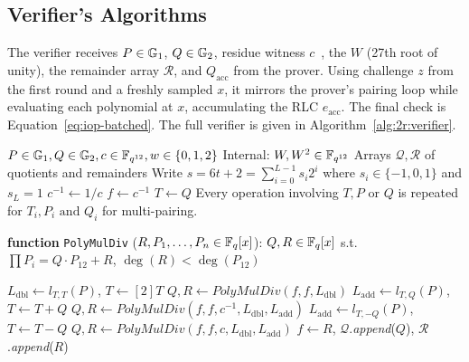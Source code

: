 \subsection{Verifier's Algorithms}

The verifier receives $P \in \mathbb{G}_1$, $Q \in \mathbb{G}_2$, residue witness $c$~\cite{EPRINT:NovEag24}, the $W$ (27th root of unity), the remainder array $\mathcal{R}$, and $Q_\text{acc}$ from the prover. Using challenge $z$ from the first round and a freshly sampled $x$, it mirrors the prover's pairing loop while evaluating each polynomial at $x$, accumulating the RLC $e_\text{acc}$. The final check is Equation~\ref{eq:iop-batched}. The full verifier is given in Algorithm~\ref{alg:2r:verifier}.


\begin{algorithm}[H]
\caption{Pairing Prover: Preparing polynomials}
\label{alg:2r:prover}
\begin{algorithmic}[1]
\Require $P \in \mathbb{G}_1, Q \in \mathbb{G}_2, c \in \mathbb{F}_{q^{12}}, w \in \{0,1,2\}$
\Statex Internal: $W, W^2 \in \mathbb{F}_{q^{12}}$ 
\Ensure Arrays $\mathcal{Q}, \mathcal{R}$ of quotients and remainders
\Statex Write $s = 6t + 2 = \sum_{i=0}^{L-1} s_i 2^i$ where $s_i \in \{-1, 0, 1\}$ and $s_L = 1$
\State $c^{-1} \leftarrow 1 / c$ 
\State $f \leftarrow c^{-1}$ 
\State $T \leftarrow Q$ 
\color{gray}
\Statex \small{Every operation involving $T, P \text{ or } Q$ is repeated for $T_i, P_i \text{ and } Q_i$ for multi-pairing.}
\color{black}

\Statex

\State \textbf{function} \texttt{PolyMulDiv} ({$R, P_1, \ldots, P_n \in \mathbb{F}_q[x]$}): \Return $Q, R \in \mathbb{F}_q[x]$ 
\State \qquad s.t.\ $\prod P_i = Q \cdot P_{12} + R$, $\deg(R) < \deg(P_{12})$

\Statex
\Statex {}
    \State $L_\text{dbl} \leftarrow l_{T,T}(P)$, $T \leftarrow [2]T$
		\State $Q, R \leftarrow {\textit{PolyMulDiv}}(f, f, L_\text{dbl})$ 
        \State $L_\text{add} \leftarrow l_{T,Q}(P)$, $T \leftarrow T + Q$
        \State $Q, R \leftarrow {\textit{PolyMulDiv}}(f, f, c^{-1}, L_\text{dbl}, L_\text{add})$ 
        \State $L_\text{add} \leftarrow l_{T,-Q}(P)$, $T \leftarrow T - Q$
        \State $Q, R \leftarrow {\textit{PolyMulDiv}}(f, f, c, L_\text{dbl}, L_\text{add})$ 
    \EndIf
    \State $f \leftarrow R$, $\mathcal{Q}$.\textit{append}($Q$), $\mathcal{R}$.\textit{append}($R$)
\EndFor
\Statex



\end{algorithmic}
\end{algorithm}

